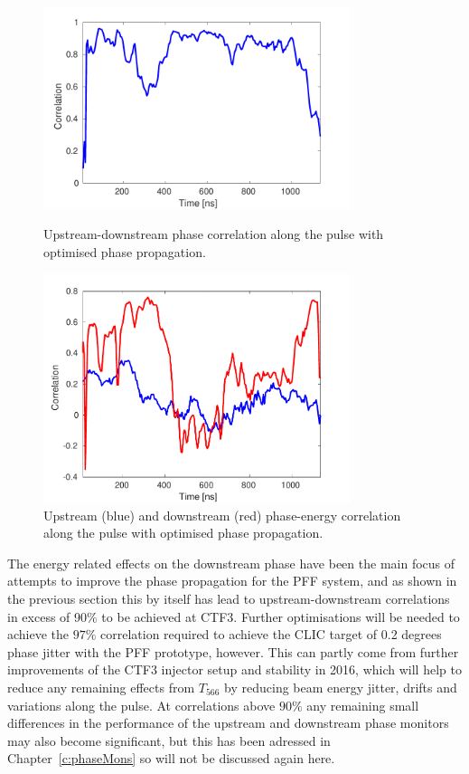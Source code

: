 \begin{figure}
  \centering
  \includegraphics[width=0.8\textwidth]{Figures/propagation/bestProp_corrAlong}
  \caption{Upstream-downstream phase correlation along the pulse with optimised phase propagation.}
  \label{f:bestProp_corrAlong}
  \includegraphics[width=0.8\textwidth]{Figures/propagation/bestProp_enCorrAlong}
  \caption{Upstream (blue) and downstream (red) phase-energy correlation along the pulse with optimised phase propagation.}
  \label{f:bestProp_enCorrAlong}
\end{figure}


The energy related effects on the downstream phase have been the main focus of attempts to improve the phase propagation for the PFF system, and as shown in the previous section this by itself has lead to upstream-downstream correlations in excess of 90\% to be achieved at CTF3. Further optimisations will be needed to achieve the \(97\%\) correlation required to achieve the CLIC target of 0.2 degrees phase jitter with the PFF prototype, however. This can partly come from further improvements of the CTF3 injector setup and stability in 2016, which will help to reduce any remaining effects from \(T_{566}\) by reducing beam energy jitter, drifts and variations along the pulse. At correlations above \(90\%\) any remaining small differences in the performance of the upstream and downstream phase monitors may also become significant, but this has been adressed in Chapter~\ref{c:phaseMons} so will not be discussed again here.

